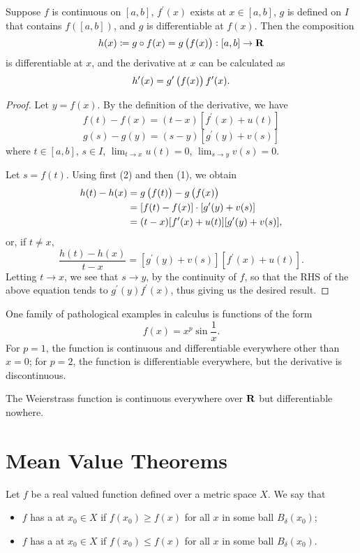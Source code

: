 \begin{lemma}
Suppose $f$ is continuous on $[a,b]$, $f^\prime(x)$ exists at $x\in[a,b]$, $g$ is defined on $I$ that contains $f([a,b])$, and $g$ is differentiable at $f(x)$. Then the composition
\[h(x)\coloneqq g\circ f(x)=g\left(f(x)\right):[a,b]\to\mathbf R\]
is differentiable at $x$, and the derivative at $x$ can be calculated as
\[h^\prime(x)=g^\prime\left(f(x)\right)f^\prime(x).\]
\end{lemma}

\begin{proof}
Let $y=f(x)$. By the definition of the derivative, we have
\begin{equation*}\tag{1}
f(t)-f(x)=(t-x)[f^\prime(x)+u(t)]
\end{equation*}
\begin{equation*}\tag{2}
g(s)-g(y)=(s-y)[g^\prime(y)+v(s)]
\end{equation*}
where $t\in[a,b]$, $s\in I$, $\lim_{t\to x}u(t)=0$, $\lim_{s\to y}v(s)=0$.

Let $s=f(t)$. Using first (2) and then (1), we obtain
\begin{align*}
h(t)-h(x)
&=g\left(f(t)\right)-g\left(f(x)\right)\\
&=[f(t)-f(x)]\cdot[g^\prime(y)+v(s)]\\
&=(t-x)[f^\prime(x)+u(t)][g^\prime(y)+v(s)],
\end{align*}
or, if $t\neq x$,
\[\frac{h(t)-h(x)}{t-x}=[g^\prime(y)+v(s)][f^\prime(x)+u(t)].\]
Letting $t\to x$, we see that $s\to y$, by the continuity of $f$, so that the RHS of the above equation tends to $g^\prime(y)f^\prime(x)$, thus giving us the desired result.
\end{proof}

\begin{example}
One family of pathological examples in calculus is functions of the form
\[f(x)=x^p\sin\frac{1}{x}.\]
For $p=1$, the function is continuous and differentiable everywhere other than $x=0$; for $p=2$, the function is differentiable everywhere, but the derivative is discontinuous.
\end{example}

\begin{example}
The Weierstrass function is continuous everywhere over $\mathbf R$ but differentiable nowhere.
\end{example}

\section{Mean Value Theorems}
\begin{definition}
Let $f$ be a real valued function defined over a metric space $X$. We say that
\begin{itemize}
\item $f$ has a  at $x_0\in X$ if $f(x_0)\ge f(x)$ for all $x$ in some ball $B_\delta(x_0)$;
\item $f$ has a  at $x_0\in X$ if $f(x_0)\le f(x)$ for all $x$ in some ball $B_\delta(x_0)$.
\end{itemize}
\end{definition}

